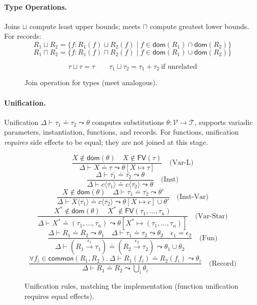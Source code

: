 \paragraph{Type Operations.}  
Joins $\sqcup$ compute least upper bounds; meets $\sqcap$ compute greatest lower bounds.  
For records:  
\[
R_1 \sqcup R_2 = \{f : R_1(f) \sqcup R_2(f) \mid f \in \mathsf{dom}(R_1) \cap \mathsf{dom}(R_2)\}
\]
\[
R_1 \sqcap R_2 = \{f : R_1(f) \sqcap R_2(f) \mid f \in \mathsf{dom}(R_1) \cup \mathsf{dom}(R_2)\}
\]

\begin{figure}[t]
\centering
\[
\tau \sqcup \tau = \tau
\quad\quad
\tau_1 \sqcup \tau_2 = \tau_1 + \tau_2 \ \text{if unrelated}
\]
\caption{Join operation for types (meet analogous).}
\label{fig:typeops}
\end{figure}

\paragraph{Unification.}  
Unification $\Delta \vdash \tau_1 \doteq \tau_2 \leadsto \theta$ computes substitutions $\theta : \mathcal{V} \to \mathcal{T}$, supports variadic parameters, instantiation, functions, and records.  
For functions, unification \emph{requires} side effects to be equal; they are not joined at this stage.

\begin{figure*}[t]
\centering
\[
\frac{X \notin \mathsf{dom}(\theta) \quad X \notin \mathsf{FV}(\tau)}{\Delta \vdash X \doteq \tau \leadsto \theta[X \mapsto \tau]} \quad \text{(Var-L)}
\]
\[
\frac{\Delta \vdash \overline{\tau_1} \doteq \overline{\tau_2} \leadsto \theta}{\Delta \vdash c\langle\overline{\tau_1}\rangle \doteq c\langle\overline{\tau_2}\rangle \leadsto \theta} \quad \text{(Inst)}
\]
\[
\frac{X \notin \mathsf{dom}(\theta) \quad \Delta \vdash \overline{\tau_1} \doteq \overline{\tau_2} \leadsto \theta'}{\Delta \vdash X\langle\overline{\tau_1}\rangle \doteq c\langle\overline{\tau_2}\rangle \leadsto \theta[X \mapsto c] \cup \theta'} \quad \text{(Inst-Var)}
\]
\[
\frac{X^* \notin \mathsf{dom}(\theta) \quad X^* \notin \mathsf{FV}(\tau_1, \ldots, \tau_n)}{\Delta \vdash X^* \doteq (\tau_1, \ldots, \tau_n) \leadsto \theta[X^* \mapsto (\tau_1, \ldots, \tau_n)]} \quad \text{(Var-Star)}
\]
\[
\frac{\Delta \vdash R_1 \doteq R_2 \leadsto \theta_1 \quad \Delta \vdash \tau_1 \doteq \tau_2 \leadsto \theta_2 \quad \epsilon_1 = \epsilon_2}{\Delta \vdash (R_1 \xrightarrow{\epsilon_1} \tau_1) \doteq (R_2 \xrightarrow{\epsilon_2} \tau_2) \leadsto \theta_1 \cup \theta_2} \quad \text{(Fun)}
\]
\[
\frac{\forall f_i \in \mathsf{common}(R_1, R_2).\ \Delta \vdash R_1(f_i) \doteq R_2(f_i) \leadsto \theta_i}{\Delta \vdash R_1 \doteq R_2 \leadsto \bigcup_i \theta_i} \quad \text{(Record)}
\]
\caption{Unification rules, matching the implementation (function unification requires equal effects).}
\label{fig:unification}
\end{figure*}


